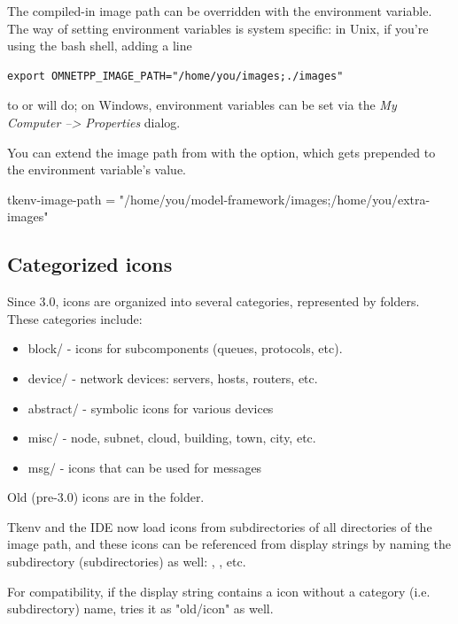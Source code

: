 The compiled-in image path can be overridden with the 
environment variable. The way of setting environment variables is system
specific: in Unix, if you're using the bash shell, adding a line

\begin{verbatim}
export OMNETPP_IMAGE_PATH="/home/you/images;./images"
\end{verbatim}

to  or  will do; on Windows, environment variables
can be set via the \textit{My Computer --> Properties} dialog.

You can extend the image path from  with the
 option, which gets prepended to the environment
variable's value.

\begin{inifile}
[General]
tkenv-image-path = "/home/you/model-framework/images;/home/you/extra-images"
\end{inifile}


\subsection{Categorized icons}

Since {\opp} 3.0, icons are organized into several categories, represented
by folders. These categories include:

\begin{itemize}
  \item block/ - icons for subcomponents (queues, protocols, etc).
  \item device/ - network devices: servers, hosts, routers, etc.
  \item abstract/ - symbolic icons for various devices
  \item misc/ - node, subnet, cloud, building, town, city, etc.
  \item msg/ - icons that can be used for messages
\end{itemize}

Old (pre-3.0) icons are in the  folder.

Tkenv and the IDE now load icons from subdirectories of all directories
of the image path, and these icons can be referenced from display strings
by naming the subdirectory (subdirectories) as well:
, , etc.

For compatibility, if the display string contains a icon without
a category (i.e. subdirectory) name, {\opp} tries it as "old/icon" as well.

